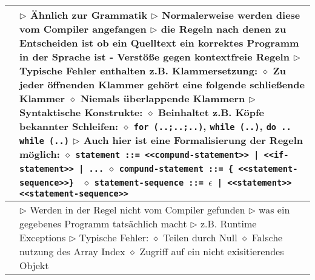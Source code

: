 \begin{table}[H]
\begin{tabular}{ | p{4cm} p{13.5cm} | }
	\makecell[l]{Syntaktische Ebene} & 
	\makecell[l]
	{
	$\rhd$ Ähnlich zur Grammatik \\
	$\rhd$ Normalerweise werden diese vom Compiler angefangen \\
	$\rhd$ die Regeln nach denen zu Entscheiden ist ob ein Quelltext \\
	\hspace{0.4cm} ein korrektes Programm in der Sprache ist \\
	\hspace{0.4cm} - Verstö\ss e gegen kontextfreie Regeln \\
	$\rhd$ Typische Fehler enthalten z.B. Klammersetzung: \\
	\hspace{0.4cm} $\diamond$ Zu jeder öffnenden Klammer gehört eine folgende schlie\ss ende Klammer \\
	\hspace{0.4cm} $\diamond$ Niemals überlappende Klammern \\
	$\rhd$ Syntaktische Konstrukte: \\
	\hspace{0.4cm} $\diamond$ Beinhaltet z.B. Köpfe bekannter Schleifen: \\
	\hspace{0.4cm} $\diamond$ \texttt{for (..;..;..)}, \texttt{while (..)}, \texttt{do .. while (..)} \\
	$\rhd$ Auch hier ist eine Formalisierung der Regeln möglich: \\
	\hspace{0.4cm} $\diamond$ \texttt{statement ::= <<compund-statement>> | <<if-statement>> | ...} \\
	\hspace{0.4cm} $\diamond$ \texttt{compund-statement ::= \{ <<statement-sequence>>\} } \\
	\hspace{0.4cm} $\diamond$ \texttt{statement-sequence ::= $\epsilon$ | <<statement>> <<statement-sequence>>} \\
	} 	\\ \hline


	\makecell[l]{Semantische Ebene} & 
	\makecell[l]
	{
	$\rhd$ Werden in der Regel nicht vom Compiler gefunden \\
	$\rhd$ was ein gegebenes Programm tatsächlich macht \\
	$\rhd$ z.B. Runtime Exceptions \\
	$\rhd$ Typische Fehler: \\
	\hspace{0.4cm} $\diamond$ Teilen durch Null \\
	\hspace{0.4cm} $\diamond$ Falsche nutzung des Array Index \\
	\hspace{0.4cm} $\diamond$ Zugriff auf ein nicht exisitierendes Objekt \\
	} 	\\ \hline



\end{tabular}
\end{table}
